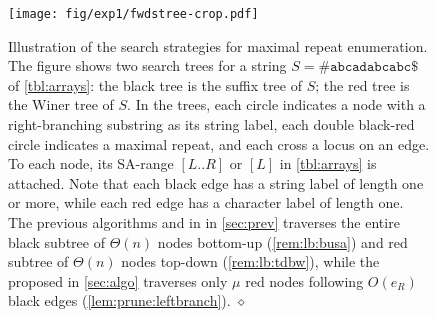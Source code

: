\begin{figure}[t]
\centering  
\texttt{[image: fig/exp1/fwdstree-crop.pdf]}
\smallskip
  \caption{Illustration of the search strategies for maximal repeat enumeration. The figure shows two search trees for a string $S = \mathtt{\#abcadabcabc\$}$ of \cref{tbl:arrays}: the black tree is the suffix tree of $S$; the red tree is the Winer tree of $S$. In the trees, each circle indicates a node with a right-branching substring as its string label, each double black-red circle indicates a maximal repeat, and each cross a locus on an edge. To each node, its SA-range $[L..R]$ or $[L]$ in \cref{tbl:arrays} is attached. 
    Note that each black edge has a string label of length one or more, while each red edge has a character label of length one.
    The previous algorithms \BUSA{} and \TDBW{} in in \cref{sec:prev} traverses the entire black subtree of $\Theta(n)$ nodes bottom-up (\cref{rem:lb:busa}) and red subtree of $\Theta(n)$ nodes top-down (\cref{rem:lb:tdbw}), while the proposed \TDSA{} in \cref{sec:algo} traverses only $\mu$ red nodes following $O(e_R)$ black edges (\cref{lem:prune:leftbranch}). $\diamond$
}\label{fig:fwdstree}
\end{figure}


